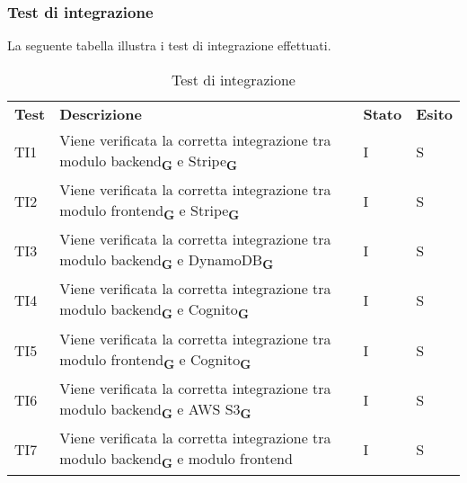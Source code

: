 \subsubsection{Test di integrazione}
La seguente tabella illustra i test di integrazione effettuati.
\begin{center}
    \centering
    \renewcommand{\arraystretch}{1.8}
    \label{tab:TestIntegrazione}
    \begin{longtable}[!h]{p{45px} p{255px} p{35px} p{35px}}
        \caption{Test di integrazione}                                                                                                                                                \\
        \rowcolor{logo!70}
        \textbf{Test} & \textbf{Descrizione}                                                                                                        & \textbf{Stato} & \textbf{Esito} \\
        TI1           & Viene verificata la corretta integrazione tra modulo backend\textsubscript{\textbf{G}} e Stripe\textsubscript{\textbf{G}}   & I              & S              \\
        TI2           & Viene verificata la corretta integrazione tra modulo frontend\textsubscript{\textbf{G}} e Stripe\textsubscript{\textbf{G}}  & I              & S              \\
        TI3           & Viene verificata la corretta integrazione tra modulo backend\textsubscript{\textbf{G}} e DynamoDB\textsubscript{\textbf{G}} & I              & S              \\
        TI4           & Viene verificata la corretta integrazione tra modulo backend\textsubscript{\textbf{G}} e Cognito\textsubscript{\textbf{G}}  & I              & S              \\
        TI5           & Viene verificata la corretta integrazione tra modulo frontend\textsubscript{\textbf{G}} e Cognito\textsubscript{\textbf{G}} & I              & S              \\
        TI6           & Viene verificata la corretta integrazione tra modulo backend\textsubscript{\textbf{G}} e AWS S3\textsubscript{\textbf{G}}   & I              & S              \\
        TI7           & Viene verificata la corretta integrazione tra modulo backend\textsubscript{\textbf{G}} e modulo frontend                    & I              & S              \\
    \end{longtable}
\end{center}
\pagebreak

